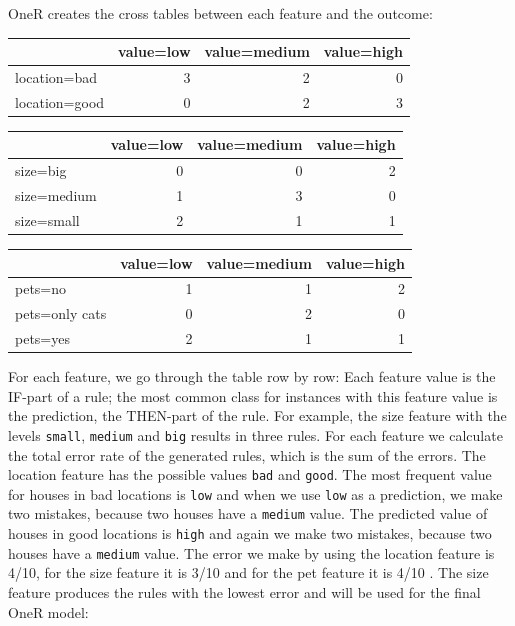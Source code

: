 \documentclass[
  11pt,
]{scrbook}
\begin{document}
OneR creates the cross tables between each feature and the outcome:

\begin{table}
\centering
\begin{tabular}{lrrr}
\toprule
  & value=low & value=medium & value=high\\
\midrule
location=bad & 3 & 2 & 0\\
location=good & 0 & 2 & 3\\
\bottomrule
\end{tabular}
\end{table}

\begin{table}
\centering
\begin{tabular}{lrrr}
\toprule
  & value=low & value=medium & value=high\\
\midrule
size=big & 0 & 0 & 2\\
size=medium & 1 & 3 & 0\\
size=small & 2 & 1 & 1\\
\bottomrule
\end{tabular}
\end{table}

\begin{table}
\centering
\begin{tabular}{lrrr}
\toprule
  & value=low & value=medium & value=high\\
\midrule
pets=no & 1 & 1 & 2\\
pets=only cats & 0 & 2 & 0\\
pets=yes & 2 & 1 & 1\\
\bottomrule
\end{tabular}
\end{table}

For each feature, we go through the table row by row:
Each feature value is the IF-part of a rule;
the most common class for instances with this feature value is the prediction, the THEN-part of the rule.
For example, the size feature with the levels \texttt{small}, \texttt{medium} and \texttt{big} results in three rules.
For each feature we calculate the total error rate of the generated rules, which is the sum of the errors.
The location feature has the possible values \texttt{bad} and \texttt{good}.
The most frequent value for houses in bad locations is \texttt{low} and when we use \texttt{low} as a prediction, we make two mistakes, because two houses have a \texttt{medium} value.
The predicted value of houses in good locations is \texttt{high} and again we make two mistakes, because two houses have a \texttt{medium} value.
The error we make by using the location feature is 4/10, for the size feature it is 3/10 and for the pet feature it is 4/10 .
The size feature produces the rules with the lowest error and will be used for the final OneR model:
\end{document}
